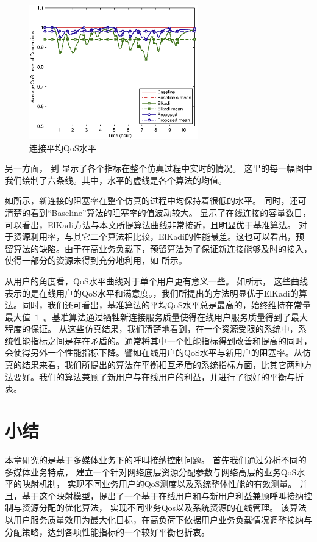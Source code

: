 % 
\begin{figure}[htbp]
\centering
\includegraphics[width=0.65\textwidth] {cacop_avg_qos.eps}
\caption{连接平均QoS水平}\label{fig:chap_cacop:clock_avg_call_qos}
\end{figure}



另一方面， 到  显示了各个指标在整个仿真过程中实时的情况。
这里的每一幅图中我们绘制了六条线。其中，水平的虚线是各个算法的均值。

如所示，新连接的阻塞率在整个仿真的过程中均保持着很低的水平。
同时，还可清楚的看到“Baseline”算法的阻塞率的值波动较大。
 显示了在线连接的容量数目，可以看出，ElKadi方法与本文所提算法曲线非常接近，且明显优于基准算法。
对于资源利用率，与其它二个算法相比较，ElKadi的性能最差。这也可以看出，预留算法的缺陷。由于在高业务负载下，预留算法为了保证新连接能够及时的接入，使得一部分的资源未得到充分地利用，如 所示。
 
从用户的角度看，QoS水平曲线对于单个用户更有意义一些。
如所示，
这些曲线表示的是在线用户的QoS水平和满意度。，我们所提出的方法明显优于ElKadi的算法。同时，我们还可看出，基准算法的平均QoS水平总是最高的，始终维持在常量最大值~$1$~。基准算法通过牺牲新连接服务质量使得在线用户服务质量得到了最大程度的保证。
从这些仿真结果，我们清楚地看到，在一个资源受限的系统中，系统性能指标之间是存在矛盾的。通常将其中一个性能指标得到改善和提高的同时，会使得另外一个性能指标下降。譬如在线用户的QoS水平与新用户的阻塞率。从仿真的结果来看，我们所提出的算法在平衡相互矛盾的系统指标方面，比其它两种方法要好。我们的算法兼顾了新用户与在线用户的利益，并进行了很好的平衡与折衷。

\section{小结}
本章研究的是基于多媒体业务下的呼叫接纳控制问题。
首先我们通过分析不同的多媒体业务特点，
建立一个针对网络底层资源分配参数与网络高层的业务QoS水平的映射机制，
实现不同业务用户的QoS测度以及系统整体性能的有效测量。
并且，基于这个映射模型，提出了一个基于在线用户和与新用户利益兼顾呼叫接纳控制与资源分配的优化算法，
实现不同业务Qos以及系统资源的在线管理。
该算法以用户服务质量效用为最大化目标，在高负荷下依据用户业务负载情况调整接纳与分配策略，达到各项性能指标的一个较好平衡也折衷。
%


